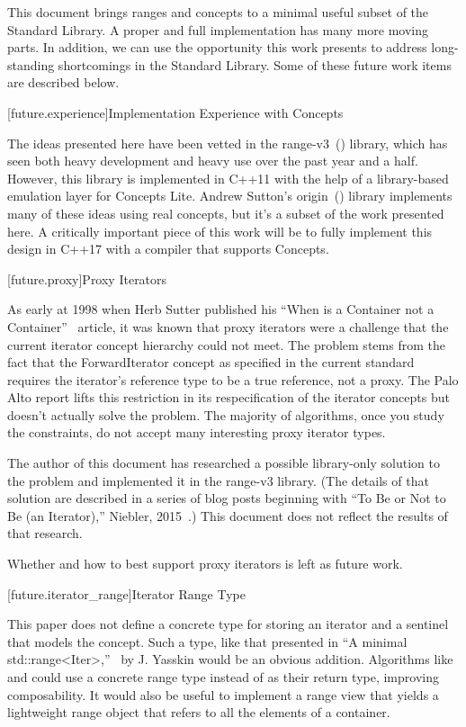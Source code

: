 
\pnum
This document brings ranges and concepts to a minimal useful subset of the Standard Library.
A proper and full implementation has many more moving parts. In addition, we can use the opportunity
this work presents to address long-standing shortcomings in the Standard Library. Some of these
future work items are described below.

[future.experience]{Implementation Experience with Concepts}

\pnum
The ideas presented here have been vetted in the range-v3~(\cite{range-v3}) library, which has seen both heavy
development and heavy use over the past year and a half. However, this library is implemented in
C++11 with the help of a library-based emulation layer for Concepts Lite. Andrew Sutton's origin~(\cite{origin})
library implements many of these ideas using real concepts, but it's a subset of the work presented
here. A critically important piece of this work will be to fully implement this design in C++17 with
a compiler that supports Concepts.

[future.proxy]{Proxy Iterators}

\pnum
As early at 1998 when Herb Sutter published his ``When is a Container not a Container''~\cite{Sutter1998}
article, it was known that proxy iterators were a challenge that the current iterator concept
hierarchy could not meet. The problem stems from the fact that the ForwardIterator concept as
specified in the current standard requires the iterator's reference type to be a true reference, not
a proxy. The Palo Alto report lifts this restriction in its respecification of the iterator
concepts but doesn't actually solve the problem. The majority of algorithms, once you study the
constraints, do not accept many interesting proxy iterator types.

\pnum
The author of this document has researched a possible library-only solution to the problem and
implemented it in the range-v3 library. (The details of that solution are described in a series of
blog posts beginning with ``To Be or Not to Be (an Iterator),'' Niebler, 2015~\cite{niebler2015}.) This
document does not reflect the results of that research.

Whether and how to best support proxy iterators is left as future work.

[future.iterator_range]{Iterator Range Type}

\pnum
This paper does not define a concrete type for storing an iterator and a sentinel that models the
 concept. Such a type, like that presented in ``A minimal std::range<Iter>,''~\cite{yasskin2012}
by J. Yasskin would be an obvious addition. Algorithms like  and
 could use a concrete range type instead of  as their return type,
improving composability. It would also be useful to implement a  range view that
yields a lightweight range object that refers to all the elements of a container.

